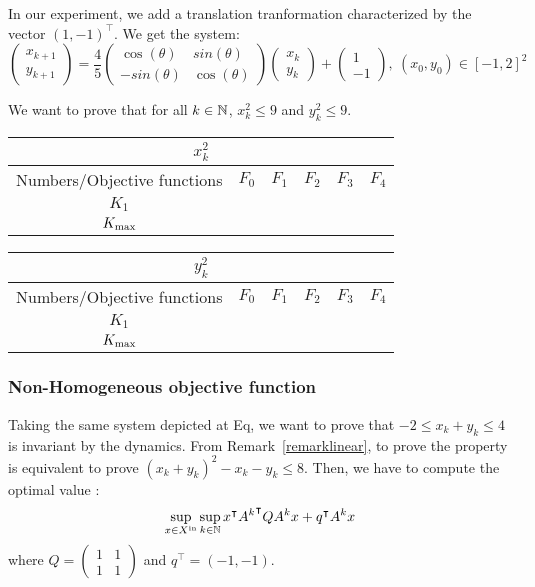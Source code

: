 \documentclass[10pt]{article}
\begin{document}
In our experiment, we add a translation tranformation characterized by the vector $(1,-1)^\intercal$. We get the system:
\[
\begin{pmatrix}
x_{k+1}\\
y_{k+1}
\end{pmatrix}
= \dfrac{4}{5}\begin{pmatrix}
 \cos(\theta)& sin(\theta)\\
-sin(\theta) & \cos(\theta)
\end{pmatrix}
\begin{pmatrix}
x_{k}\\
y_{k}
\end{pmatrix}+\begin{pmatrix}
1\\
-1
\end{pmatrix},\ (x_0,y_0)\in [-1,2]^2
\]

We want to prove that for all $k\in\mathbb{N}$, $x_k^2\leq 9$ and $y_k^2\leq 9$.

\begin{center}
\begin{tabular}{|c|c|c|c|c|c|}
\hline
\multicolumn{6}{|c|}{$x^2_k$}\\
\hline
Numbers/Objective functions & $F_0$ & $F_{1}$ & $F_{2}$ & $F_3$ & $F_4$ \\
\hline
$K_1$ & & & & & \\
\hline
 $K_{\rm max}$ & & & & & \\
\hline
\end{tabular}
\end{center}

\begin{center}
\begin{tabular}{|c|c|c|c|c|c|}
\hline
\multicolumn{6}{|c|}{$y_k^2$}\\
\hline
Numbers/Objective functions & $F_0$ & $F_{1}$ & $F_{2}$ & $F_3$ & $F_4$ \\
\hline
$K_1$ & & & & & \\
\hline
 $K_{\rm max}$ & & & & & \\
\hline
\end{tabular}
\end{center}



\subsubsection{Non-Homogeneous objective function}

Taking the same system depicted at Eq, we want to prove that $-2\leq x_k+y_k\leq 4$ is invariant by the dynamics. From Remark~\ref{remarklinear}, to prove the property is equivalent to prove $(x_k+ y_k)^2-x_k- y_k\leq 8$. Then, we have to compute the optimal value :
\[
\sup_{x\in X^\mathrm{in}} \sup_{k\in\mathbb{N}} x^\intercal {A^k}^\intercal Q A^k x+q^\intercal A^k x  
\]
where $Q=\begin{pmatrix} 1 & 1 \\ 1 & 1\end{pmatrix}$ and $q^\intercal=(-1,-1)$.  
\end{document}
